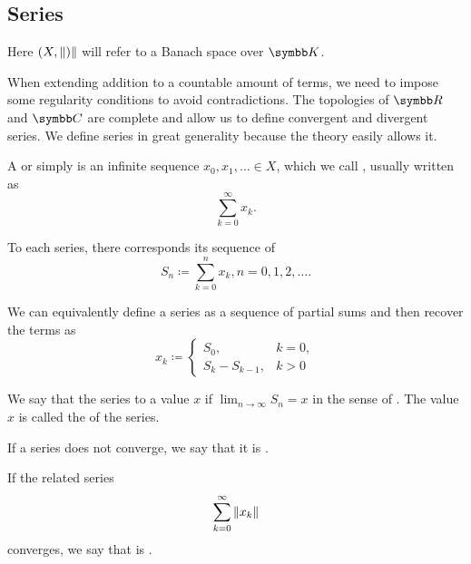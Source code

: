 \subsection{Series}\label{subsec:series}

Here \( (X, \left\Vert ) \right\Vert \) will refer to a Banach space over \( \BK \).

\begin{definition}\label{def:convergent_series}
  When extending addition to a countable amount of terms, we need to impose some regularity conditions to avoid contradictions. The topologies of \( \BR \) and \( \BC \) are complete and allow us to define convergent and divergent series. We define series in great generality because the theory easily allows it.

  A  or simply  is an infinite sequence \( x_0, x_1, \ldots \in X \), which we call , usually written as
  \begin{equation}\label{def:convergent_series/series}
    \sum_{k=0}^\infty x_k.
  \end{equation}

  To each series, there corresponds its sequence of 
  \begin{equation*}
    S_n \coloneqq \sum_{k=0}^n x_k, n = 0, 1, 2, \ldots.
  \end{equation*}

  We can equivalently define a series as a sequence of partial sums and then recover the terms as
  \begin{equation*}
    x_k \coloneqq \begin{cases}
      S_0,           &k = 0, \\
      S_k - S_{k-1}, &k > 0
    \end{cases}
  \end{equation*}

  We say that the series   to a value \( x \) if \( \lim_{n \to \infty} S_n = x \) in the sense of . The value \( x \) is called the  of the series.

  If a series does not converge, we say that it is .

  If the related series
  \begin{equation}\label{def:convergent_series/absolute_series}
    \sum_{k=0}^\infty \left\Vert x_k \right\Vert
  \end{equation}
  converges, we say that  is .
\end{definition}

